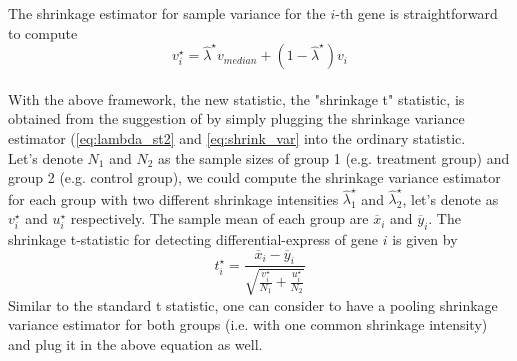 The shrinkage estimator for sample variance for the $i$-th gene is straightforward to compute
\begin{equation} \label{eq:shrink_var}
	v^\star_i = \hat \lambda^\star v_{median} + (1-\hat \lambda^\star)v_i
\end{equation}
\\[1ex]
With the above framework, the new statistic, the "shrinkage t" statistic, is obtained from the suggestion of \cite{OpgenRhein:2007p11} by simply plugging the shrinkage variance estimator (\autoref{eq:lambda_st2} and \autoref{eq:shrink_var} into the ordinary statistic. \\
Let's denote $N_1$ and $N_2$ as the sample sizes of group 1 (e.g. treatment group) and group 2 (e.g. control group), we could compute the shrinkage variance estimator for each group with two different shrinkage intensities $\hat \lambda^\star_1$ and $\hat \lambda^\star_2$, let's denote as $v^\star_i$ and $u^\star_i$ respectively. The sample mean of each group are $\overline{x}_i$ and $\overline{y}_i$. The shrinkage t-statistic for detecting differential-express of gene $i$ is given by
\begin{equation} \label{eq:shrink-t}
	t^\star_i = \frac{\overline{x}_i - \overline{y}_i}{\sqrt{ \frac{v^\star_i}{N_1} + \frac{u^\star_i}{N_2} }}
\end{equation}
Similar to the standard t statistic, one can consider to have a pooling shrinkage variance estimator for both groups (i.e. with one common shrinkage intensity) and plug it in the above equation as well.